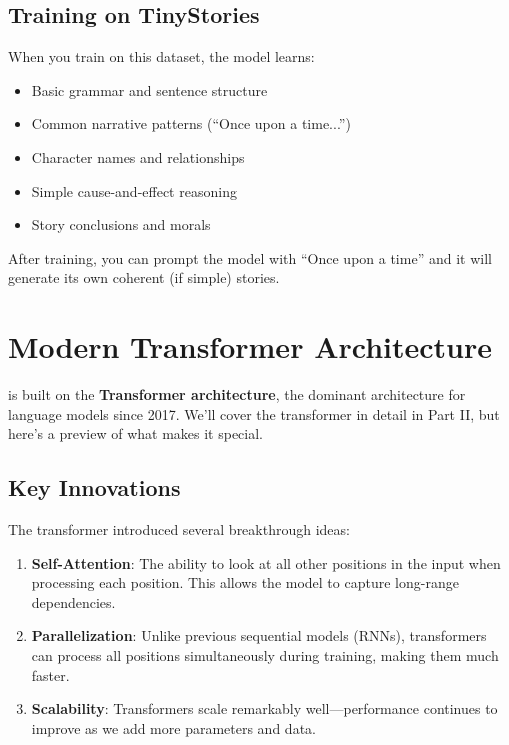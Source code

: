 \subsection{Training on TinyStories}

When you train \TryLM on this dataset, the model learns:
\begin{itemize}
    \item Basic grammar and sentence structure
    \item Common narrative patterns (``Once upon a time...'')
    \item Character names and relationships
    \item Simple cause-and-effect reasoning
    \item Story conclusions and morals
\end{itemize}

After training, you can prompt the model with ``Once upon a time'' and it will generate its own coherent (if simple) stories.

\section{Modern Transformer Architecture}

\TryLM is built on the \textbf{Transformer architecture}, the dominant architecture for language models since 2017. We'll cover the transformer in detail in Part II, but here's a preview of what makes it special.

\subsection{Key Innovations}

The transformer introduced several breakthrough ideas:

\begin{enumerate}
    \item \textbf{Self-Attention}: The ability to look at all other positions in the input when processing each position. This allows the model to capture long-range dependencies.

    \item \textbf{Parallelization}: Unlike previous sequential models (RNNs), transformers can process all positions simultaneously during training, making them much faster.

    \item \textbf{Scalability}: Transformers scale remarkably well---performance continues to improve as we add more parameters and data.
\end{enumerate}

